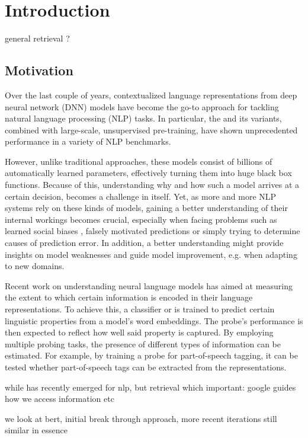 \chapter{Introduction}
general retrieval ?
\section{Motivation}
Over the last couple of years, contextualized language representations from deep neural network (DNN) models have become the go-to approach for tackling natural language processing (NLP) tasks. In particular, the  \cite{vaswani2017attention} and its variants, combined with large-scale, unsupervised pre-training, have shown unprecedented performance in a variety of NLP benchmarks.

However, unlike traditional approaches, these models consist of billions of automatically learned parameters, effectively turning them into huge black box functions. Because of this, understanding why and how such a model arrives at a certain decision, becomes a challenge in itself. Yet, as more and more NLP systems rely on these kinds of models, gaining a better understanding of their internal workings becomes crucial, especially when facing problems such as learned social biases \cite{Nadeem2021StereoSetMS,Bender2021OnTD, kurita2019measuring}, falsely motivated predictions \cite{10.1145/2939672.2939778, DBLP:journals/corr/abs-1802-00614} or simply trying to determine causes of prediction error. In addition, a better understanding might provide insights on model weaknesses and guide model improvement, e.g. when adapting to new domains.

Recent work on understanding neural language models has aimed at measuring the extent to which certain information is encoded in their language representations. To achieve this, a  classifier or  is trained to predict certain linguistic properties from a model's word embeddings. The probe's performance is then expected to reflect how well said property is captured. By employing multiple probing tasks, the presence of different types of information can be estimated. For example, by training a probe for part-of-speech tagging, it can be tested whether part-of-speech tags can be extracted from the representations.


while has recently emerged for nlp, but retrieval which important: google guides how we access information etc

we look at bert, initial break through approach, more recent iterations still similar in essence

